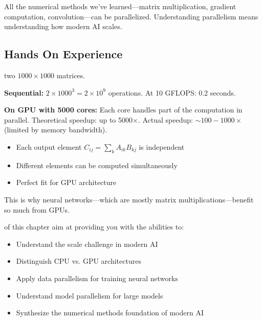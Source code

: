  All the numerical methods we've learned---matrix multiplication, gradient computation, convolution---can be parallelized. Understanding parallelism means understanding how modern AI scales.



\newpage
\subsection{Hands On Experience}

 two $1000 \times 1000$ matrices.

\textbf{Sequential:} $2 \times 1000^3 = 2 \times 10^9$ operations.
At 10 GFLOPS: 0.2 seconds.

\textbf{On GPU with 5000 cores:}
Each core handles part of the computation in parallel.
Theoretical speedup: up to 5000$\times$.
Actual speedup: $\sim 100-1000\times$ (limited by memory bandwidth).


\begin{itemize}
    \item Each output element $C_{ij} = \sum_k A_{ik} B_{kj}$ is independent
    \item Different elements can be computed simultaneously
    \item Perfect fit for GPU architecture
\end{itemize}

This is why neural networks---which are mostly matrix multiplications---benefit so much from GPUs.


\vspace{2.5em}
 of this chapter aim at providing you with the abilities to:
\begin{itemize}
    \item Understand the scale challenge in modern AI
    \item Distinguish CPU vs. GPU architectures
    \item Apply data parallelism for training neural networks
    \item Understand model parallelism for large models
    \item Synthesize the numerical methods foundation of modern AI
\end{itemize}




